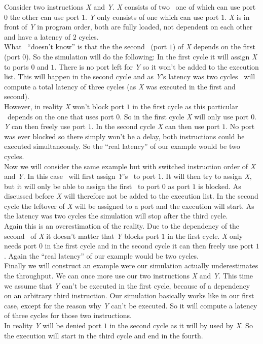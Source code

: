 Consider two instructions \emph{X} and \emph{Y}. \emph{X} consists of two \microops\ one of which can use port $0$ the other can use port $1$. \emph{Y} only consists of one which can use port $1$. \emph{X} is in front of \emph{Y} in program order, both are fully loaded, not dependent on each other and have a latency of $2$ cycles.\\
What \suaca\ ``doesn't know'' is that the the second \microop\ (port $1$) of \emph{X} depends on the first (port $0$). So the simulation will do the following: In the first cycle it will assign \emph{X} to ports $0$ and $1$. There is no port left for \emph{Y} so it won't be added to the execution list. This will happen in the second cycle and as \emph{Y}'s latency was two cycles \suaca\ will compute a total latency of three cycles (as \emph{X} was executed in the first and second).\\
However, in reality \emph{X} won't block port $1$ in the first cycle as this particular \microop\ depends on the one that uses port $0$. So in the first cycle \emph{X} will only use port $0$. \emph{Y} can then freely use port $1$. In the second cycle \emph{X} can then use port $1$. No port was ever blocked so there simply won't be a delay, both instructions could be executed simultaneously. So the ``real latency'' of our example would be two cycles.\\

Now we will consider the same example but with switched instruction order of \emph{X} and \emph{Y}. In this case \suaca\ will first assign \emph{Y}'s \microop\ to port $1$. It will then try to assign \emph{X}, but it will only be able to assign the first \microop\ to port $0$ as port $1$ is blocked. As discussed before \emph{X} will therefore not be added to the execution list. In the second cycle the leftover of \emph{X} will be assigned to a port and the execution will start. As the latency was two cycles the simulation will stop after the third cycle.\\
Again this is an overestimation of the reality. Due to the dependency of the second \microop\ of \emph{X} it doesn't matter that \emph{Y} blocks port $1$ in the first cycle. \emph{X} only needs port $0$ in the first cycle and in the second cycle it can then freely use port $1$. Again the ``real latency'' of our example would be two cycles.\\

Finally we will construct an example were our simulation actually underestimates the throughput. We can once more use our two instructions \emph{X} and \emph{Y}. This time we assume that \emph{Y} can't be executed in the first cycle, because of a dependency on an arbitrary third instruction. Our simulation basically works like in our first case, except for the reason why \emph{Y} can't be executed. So it will compute a latency of three cycles for those two instructions.\\
In reality \emph{Y} will be denied port $1$ in the second cycle as it will by used by \emph{X}. So the execution will start in the third cycle and end in the fourth.\\

